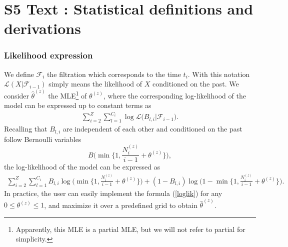 


\section*{S5 Text : Statistical definitions and derivations}
\subsubsection*{Likelihood expression}
We define $\mathcal{F}_i$ the filtration which corresponds to the time $t_i$. With this notation $\mathcal{L}( X | \mathcal{F}_{i-1})$ simply means the likelihood of $X$ conditioned on the past. We consider $\widehat{\theta}^{(z)}$ the MLE\footnote{Apparently, this MLE is a partial MLE, but we will not refer to partial for simplicity.} of $\theta^{(z)}$, where the corresponding log-likelihood of the model can be expressed up to constant terms as
\begin{eqnarray*}
\sum_{i=2}^Z \sum_{l=1}^{C_i} \log \mathcal{L} \big( B_{l,i} | \mathcal{F}_{i-1} \big).
\end{eqnarray*}
Recalling that $B_{l,i}$ are independent of each other and conditioned on the past follow Bernoulli variables 
$$B \Big( \min \Big\{ 1, \frac{N_{i}^{(z)}}{i-1} + \theta^{(z)} \Big\} \Big),$$ 
the log-likelihood of the model can be expressed as 
\begin{eqnarray}
\label{loglik}
\sum_{i=2}^Z \sum_{l=1}^{C_i} B_{l,i} \log \Big( \min \Big\{ 1, \frac{N_{i}^{(z)}}{i-1} + \theta^{(z)} \Big\} \Big) +(1 - B_{l,i}) \log \Big(1 - \min \Big\{ 1, \frac{N_{i}^{(z)}}{i-1} + \theta^{(z)} \Big\} \Big).
\end{eqnarray}
In practice, the user can easily implement the formula (\ref{loglik}) for any $0 \leq \theta^{(z)} \leq 1$, and maximize it over a predefined grid to obtain $\widehat{\theta}^{(z)}$.


